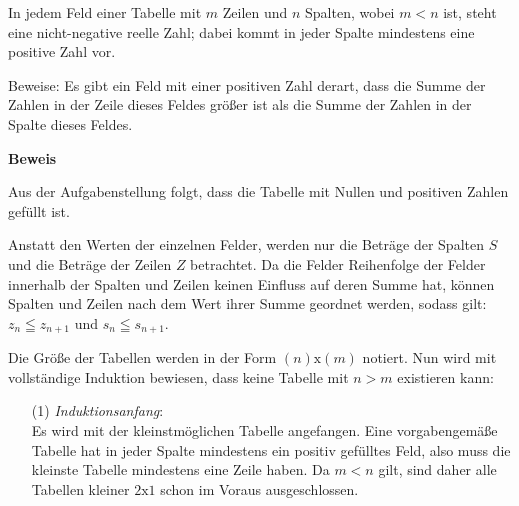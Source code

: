 \documentclass[10pt, a4paper]{amsart}
\makeatletter
\renewcommand\proofname{Beweis}
\renewenvironment{proof}[1][\proofname]{\par
\pushQED{\qed}%
\normalfont \topsep6\p@\@plus6\p@\relax
\trivlist
\item\relax
{\bfseries#1}\hspace\labelsep\ignorespaces
}{%
\popQED\endtrivlist\@endpefalse
}
\makeatother
\begin{document}
\newpage
\begin{aufgabe}
  In jedem Feld einer Tabelle mit $m$ Zeilen und $n$ Spalten, wobei $m < n$ ist,
  steht eine nicht-negative reelle Zahl; dabei kommt in jeder Spalte mindestens
  eine positive Zahl vor.
  
  Beweise: Es gibt ein Feld mit einer positiven Zahl derart, dass die Summe der
  Zahlen in der Zeile dieses Feldes größer ist als die Summe der Zahlen in der
  Spalte dieses Feldes.
\end{aufgabe}
\begin{proof}
  Aus der Aufgabenstellung folgt, dass die Tabelle mit Nullen und positiven
  Zahlen gefüllt ist. 

  Anstatt den Werten der einzelnen Felder, werden nur die Beträge der Spalten
  $S$ und die Beträge der Zeilen $Z$ betrachtet. Da die Felder Reihenfolge der
  Felder innerhalb der Spalten und Zeilen keinen Einfluss auf deren Summe hat,
  können Spalten und Zeilen nach dem Wert ihrer Summe geordnet werden, sodass gilt: $z_n\leqq z_{n+1}$ und $s_n\leqq s_{n+1}$.

  Die Größe der Tabellen werden in der Form $(n)\text{x}(m)$ notiert. Nun wird
  mit vollständige Induktion bewiesen, dass keine Tabelle mit $n > m$ existieren
  kann:
  \begin{itemize}[itemsep=2ex]
  \item[(1)]\emph{Induktionsanfang}:\\
    Es wird mit der kleinstmöglichen Tabelle angefangen. Eine vorgabengemäße
    Tabelle hat in jeder Spalte mindestens ein positiv gefülltes Feld, also muss
    die kleinste Tabelle mindestens eine Zeile haben. Da $m<n$ gilt, sind daher
    alle Tabellen kleiner $2\text{x}1$ schon im Voraus ausgeschlossen.


\end{itemize}
\end{proof}
\end{document}
